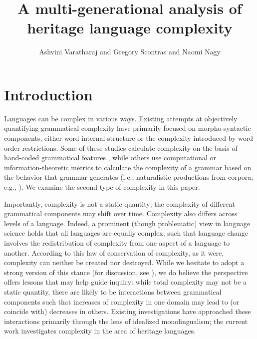 \documentclass[output=paper]{langscibook}
\title{A multi-generational analysis of heritage language complexity}
\author{Ashvini Varatharaj\affiliation{University of California, Santa Barbara} and Gregory Scontras\affiliation{University of California, Irvine} and Naomi Nagy\affiliation{University of Toronto}}
\begin{document}
\maketitle
\section{Introduction}
\begin{sloppypar}
Languages can be complex in various ways. Existing attempts at objectively quantifying grammatical complexity have primarily focused on morpho-syntactic components, either word-internal structure or the complexity introduced by word order restrictions.
Some of these studies calculate complexity on the basis of hand-coded grammatical features \citep[e.g.,][]{shosted2006correlating,lupyandale2010}, while others use computational or  information-theoretic metrics 
to calculate the complexity of a grammar based on the behavior that grammar generates (i.e., naturalistic productions from corpora; e.g.,  \citealp{juola1998measuring,koplenig2017statistical}). We examine the second type of complexity in this paper.
\end{sloppypar}

Importantly, complexity is not a static quantity; the complexity of different grammatical components may shift over time. Complexity also differs across levels of a language. Indeed, a prominent (though problematic) view in language science holds that all languages are equally complex, such that language change involves the redistribution of complexity from one aspect of a language to another. According to this law of conservation of complexity, as it were, complexity can neither be created nor destroyed. While we hesitate to adopt a strong version of this stance (for discussion, see \citealp{sampson2009language}), we do believe the perspective offers lessons that may help guide inquiry: while total complexity may not be a static quantity, there are likely to be interactions between grammatical components such that increases of complexity in one domain may lead to (or coincide with) decreases in others. Existing investigations have approached these interactions primarily through the lens of idealized monolingualism; the current work investigates complexity in the area of heritage languages.
\end{document}
